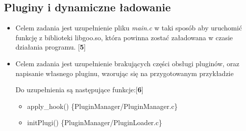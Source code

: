 \documentclass[12pt]{article}
\begin{document}
\subsection{Pluginy i dynamiczne ładowanie}
\begin{itemize}
\item Celem zadania jest uzupełnienie pliku \textit{main.c} w taki sposób aby
  uruchomić funkcję z biblioteki libgoo.so, która powinna zostać załadowana w
  czasie działania programu. [\textbf{5}]

\item Celem zadania jest uzupełnienie brakujących części obsługi pluginów,
  oraz napisanie własnego pluginu, wzorując się na przygotowanym przykładzie

  Do uzupełnienia są następujące funkcje:[\textbf{6}]

  \begin{itemize}
  \item apply\_hook() \{PluginManager/PluginManager.c\}
  \item initPlugi() \{PluginManager/PluginLoader.c\}
  \end{itemize}
\end{itemize}
\end{document}
